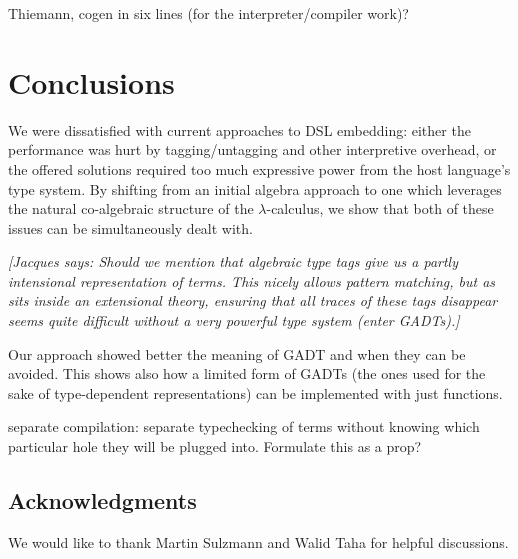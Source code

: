 \documentclass[preprint]{sigplanconf}
\newcommand{\jacques}[1]{{\it [Jacques says: #1]}}
\begin{document}
Thiemann, cogen in six lines (for the interpreter/compiler work)?

\section{Conclusions}\label{conclusion}

We were dissatisfied with current approaches to DSL embedding: either
the performance was hurt by tagging/untagging and other interpretive
overhead, or the offered solutions required too much expressive power
from the host language's type system.  By shifting from an initial
algebra approach to one which leverages the natural co-algebraic structure
of the $\lambda$-calculus, we show that both of these issues can be 
simultaneously dealt with.


\jacques{Should we mention that algebraic type tags give us a partly
intensional representation of terms.  This nicely allows pattern matching,
but as sits inside an extensional theory, ensuring that all traces 
of these tags disappear seems quite difficult without a very powerful
type system (enter GADTs).}

Our approach showed better the meaning of GADT and when they can be
avoided.
This shows also how a limited form of GADTs (the ones
used for the sake of type-dependent representations) can be
implemented with just functions. 

separate compilation: separate
typechecking of terms without knowing which particular
hole they will be plugged into. Formulate this as a prop?



\subsection*{Acknowledgments}
We would like to thank Martin Sulzmann and Walid Taha 
for helpful discussions.


\bibsep=0pt

\end{document}
